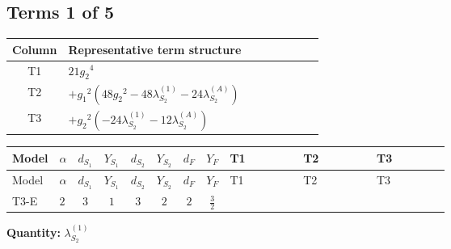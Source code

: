 \documentclass[8pt]{article}
\begin{document}
\begin{landscape}
\subsection*{Terms 1 of 5}
\begin{center}
\begin{tabular}{@{}c >{\raggedright\arraybackslash}p{0.82\linewidth}@{}}
\toprule
Column & Representative term structure \\
\midrule
T1 & \(\displaystyle 21 {g_2}^4\) \\
\midrule
T2 & \(\displaystyle +{g_1}^2 \left(48 {g_2}^2-48 {\lambda_{S_2}^{(1)}}-24 {\lambda_{S_2}^{(A)}}\right)\) \\
\midrule
T3 & \(\displaystyle +{g_2}^2 (-24 {\lambda_{S_2}^{(1)}}-12 {\lambda_{S_2}^{(A)}})\) \\
\midrule
\bottomrule
\end{tabular}
\end{center}
\smallskip
\tiny
\begin{longtable}{@{}llcccccc >{\raggedright\arraybackslash}p{0.21\linewidth} >{\raggedright\arraybackslash}p{0.21\linewidth} >{\raggedright\arraybackslash}p{0.21\linewidth}@{}}
\toprule
Model & $\alpha$ & $d_{S_1}$ & $Y_{S_1}$ & $d_{S_2}$ & $Y_{S_2}$ & $d_F$ & $Y_F$ & T1 & T2 & T3 \\
\midrule
\endfirsthead
\toprule
Model & $\alpha$ & $d_{S_1}$ & $Y_{S_1}$ & $d_{S_2}$ & $Y_{S_2}$ & $d_F$ & $Y_F$ & T1 & T2 & T3 \\
\midrule
\endhead
T3-E & $2$ & $3$ & $1$ & $3$ & $2$ & $2$ & $\frac{3}{2}$ & \scriptsize\adjustbox{max width=\linewidth}{$\begin{gathered} 21 {g_2}^4\end{gathered}$} & \scriptsize\adjustbox{max width=\linewidth}{$\begin{gathered} +{g_1}^2 \left(48 {g_2}^2-48 {\lambda_{S_2}^{(1)}}-24 {\lambda_{S_2}^{(A)}}\right)\end{gathered}$} & \scriptsize\adjustbox{max width=\linewidth}{$\begin{gathered} +{g_2}^2 (-24 {\lambda_{S_2}^{(1)}}-12 {\lambda_{S_2}^{(A)}})\end{gathered}$} \\
\midrule
\bottomrule
\end{longtable}
\clearpage
\noindent\textbf{Quantity: }$\lambda_{S_2}^{(1)}$\par\smallskip

\end{landscape}
\end{document}
